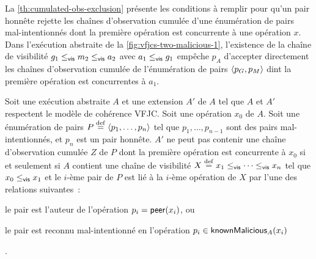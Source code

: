 La \autoref{th:cumulated-obs-exclusion} présente les conditions à remplir pour qu'un pair honnête rejette les chaînes d'observation cumulée d'une énumération de pairs mal-intentionnés dont la première opération est concurrente à une opération $x$.
Dans l'exécution abstraite de la \autoref{fig:vfjcs-two-malicious-1}, l'existence de la chaîne de visibilité $g_1 \viseq m_2 \viseq a_2$ avec $a_1 \viseq g_1$ empêche $p_A$ d'accepter directement les chaînes d'observation cumulée de l'énumération de pairs $\tuple*{p_G, p_M}$ dint la première opération est concurrentes à $a_1$.

\begin{proposition}\label{th:cumulated-obs-exclusion}
Soit une exécution abstraite $A$ et une extension $A'$ de $A$ tel que $A$ et $A'$ respectent le modèle de cohérence \ac{VFJC}.
Soit une opération $x_0$ de $A$.
Soit une énumération de pairs $P \defeq \tuple*{p_1, \dotsc ,p_n}$ tel que $p_1, \dotsc, p_{n-1}$ sont des pairs mal-intentionnés, et $p_n$ est un pair honnête.
$A'$ ne peut pas contenir une chaîne d'observation cumulée $Z$ de $P$ dont la première opération est concurrente à $x_0$ si et seulement si $A$ contient une chaîne de visibilité $X \defeq x_1 \viseq \dotsb \viseq x_n$ tel que $x_0 \viseq x_1$ et le $i$-ème pair de $P$ est lié à la $i$-ème opération de $X$ par l'une des relations suivantes~: \begin{inlinelist}
    \item le pair est l'auteur de l'opération $p_i = \trm{peer}(x_i)$, ou
    \item le pair est reconnu mal-intentionné en l'opération $p_i \in \trm{knownMalicious}_A(x_i)$
\end{inlinelist}.
\end{proposition}

